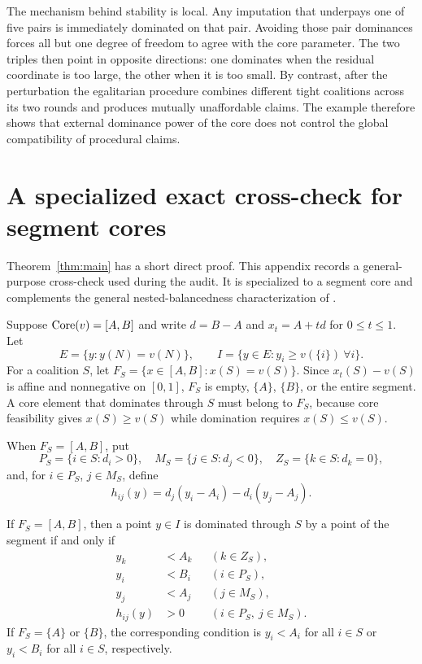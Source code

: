 The mechanism behind stability is local. Any imputation that underpays one of
five pairs is immediately dominated on that pair. Avoiding those pair
dominances forces all but one degree of freedom to agree with the core
parameter. The two triples then point in opposite directions: one dominates
when the residual coordinate is too large, the other when it is too small.
By contrast, after the perturbation the egalitarian procedure combines
different tight coalitions across its two rounds and produces mutually
unaffordable claims. The example therefore shows that external dominance
power of the core does not control the global compatibility of procedural
claims.


\appendix
\section{A specialized exact cross-check for segment cores}
\label{app:arrangement}

Theorem~\ref{thm:main} has a short direct proof. This appendix records a
general-purpose cross-check used during the audit. It is specialized to a
segment core and complements the general nested-balancedness characterization
of \citet{GrabischSudholter2024}.

Suppose $\operatorname{Core}(v)=[A,B]$ and write $d=B-A$ and
$x_t=A+td$ for $0\le t\le1$. Let
\[
 E=\{y:y(N)=v(N)\},\qquad
 I=\{y\in E:y_i\ge v(\{i\})\ \forall i\}.
\]
For a coalition $S$, let
$F_S=\{x\in[A,B]:x(S)=v(S)\}$. Since $x_t(S)-v(S)$ is affine and
nonnegative on $[0,1]$, $F_S$ is empty, $\{A\}$, $\{B\}$, or the entire
segment. A core element that dominates through $S$ must belong to $F_S$,
because core feasibility gives $x(S)\ge v(S)$ while domination requires
$x(S)\le v(S)$.

When $F_S=[A,B]$, put
\[
 P_S=\{i\in S:d_i>0\},\quad
 M_S=\{j\in S:d_j<0\},\quad
 Z_S=\{k\in S:d_k=0\},
\]
and, for $i\in P_S$, $j\in M_S$, define
\[
 h_{ij}(y)=d_j(y_i-A_i)-d_i(y_j-A_j).
\]

\begin{lemma}\label{lem:domformula}
If $F_S=[A,B]$, then a point $y\in I$ is dominated through $S$ by a point of
the segment if and only if
\[
\begin{aligned}
 y_k&<A_k &&(k\in Z_S),\\
 y_i&<B_i &&(i\in P_S),\\
 y_j&<A_j &&(j\in M_S),\\
 h_{ij}(y)&>0 &&(i\in P_S,\ j\in M_S).
\end{aligned}
\]
If $F_S=\{A\}$ or $\{B\}$, the corresponding condition is
$y_i<A_i$ for all $i\in S$ or $y_i<B_i$ for all $i\in S$, respectively.
\end{lemma}

